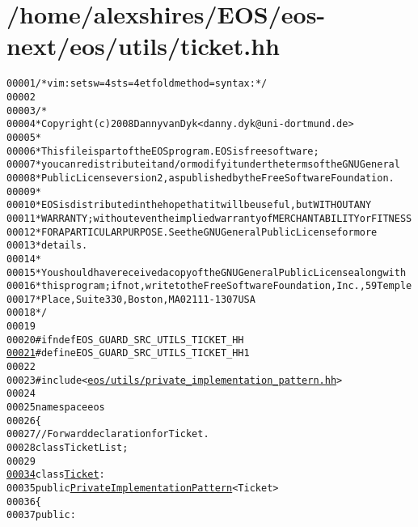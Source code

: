 \hypertarget{ticket_8hh_source}{
\section{/home/alexshires/EOS/eos-\/next/eos/utils/ticket.hh}
}


\begin{footnotesize}\begin{alltt}
00001 \textcolor{comment}{/* vim: set sw=4 sts=4 et foldmethod=syntax : */}
00002 
00003 \textcolor{comment}{/*}
00004 \textcolor{comment}{ * Copyright (c) 2008 Danny van Dyk <danny.dyk@uni-dortmund.de>}
00005 \textcolor{comment}{ *}
00006 \textcolor{comment}{ * This file is part of the EOS program. EOS is free software;}
00007 \textcolor{comment}{ * you can redistribute it and/or modify it under the terms of the GNU General}
00008 \textcolor{comment}{ * Public License version 2, as published by the Free Software Foundation.}
00009 \textcolor{comment}{ *}
00010 \textcolor{comment}{ * EOS is distributed in the hope that it will be useful, but WITHOUT ANY}
00011 \textcolor{comment}{ * WARRANTY; without even the implied warranty of MERCHANTABILITY or FITNESS}
00012 \textcolor{comment}{ * FOR A PARTICULAR PURPOSE.  See the GNU General Public License for more}
00013 \textcolor{comment}{ * details.}
00014 \textcolor{comment}{ *}
00015 \textcolor{comment}{ * You should have received a copy of the GNU General Public License along with}
00016 \textcolor{comment}{ * this program; if not, write to the Free Software Foundation, Inc., 59 Temple}
00017 \textcolor{comment}{ * Place, Suite 330, Boston, MA  02111-1307  USA}
00018 \textcolor{comment}{ */}
00019 
00020 \textcolor{preprocessor}{#ifndef EOS\_GUARD\_SRC\_UTILS\_TICKET\_HH}
\hypertarget{ticket_8hh_source_l00021}{}\hyperlink{ticket_8hh_ae4a20995d5678bf54abbf81e82f98a95}{00021} \textcolor{preprocessor}{}\textcolor{preprocessor}{#define EOS\_GUARD\_SRC\_UTILS\_TICKET\_HH 1}
00022 \textcolor{preprocessor}{}
00023 \textcolor{preprocessor}{#include <\hyperlink{private__implementation__pattern_8hh}{eos/utils/private_implementation_pattern.hh}>}
00024 
00025 \textcolor{keyword}{namespace }eos
00026 \{
00027     \textcolor{comment}{// Forward declaration for Ticket.}
00028     \textcolor{keyword}{class }TicketList;
00029 
\hypertarget{ticket_8hh_source_l00034}{}\hyperlink{classeos_1_1Ticket}{00034}     \textcolor{keyword}{class }\hyperlink{classeos_1_1Ticket}{Ticket} :
00035         \textcolor{keyword}{public} \hyperlink{classeos_1_1PrivateImplementationPattern}{PrivateImplementationPattern}<Ticket>
00036     \{
00037         \textcolor{keyword}{public}:

\end{alltt}
\end{footnotesize}
